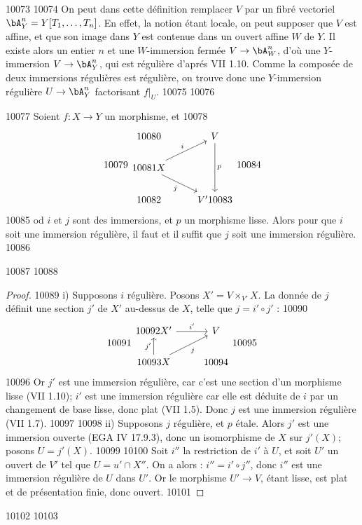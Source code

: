  10073	
 10074	On peut dans cette définition remplacer $V$ par un fibré vectoriel $\bA^n_Y = Y[T_1,\ldots,T_n]$. En effet, la notion étant locale, on peut supposer que $V$ est affine, et que son image dans $Y$ est contenue dans un ouvert affine $W$ de $Y$. Il existe alors un entier $n$ et une $W$-immersion fermée $V \to \bA^n_W$, d'où une $Y$-immersion $V \to \bA^n_Y$, qui est régulière d'aprés VII 1.10. Comme la composée de deux immersions régulières est régulière, on trouve donc une $Y$-immersion régulière $U \to \bA^n_Y$ factorisant $f|_U$.
 10075	
 10076	\begin{proposition}[1.2]%
 10077	Soient $f : X \to Y$ un morphisme, et
 10078	\[
 10079	\begin{tikzcd}
 10080	& V \arrow[dd, "p"] \\
 10081	X \arrow[ru, "i"] \arrow[rd, "j"'] & \\
 10082	& V'
 10083	\end{tikzcd}
 10084	\]
 10085	od $i$ et $j$ sont des immersions, et $p$ un morphisme lisse. Alors pour que $i$ soit une immersion régulière, il faut et il suffit que $j$ soit une immersion régulière.
 10086	\end{proposition}
 10087	
 10088	\begin{proof}
 10089	i) Supposons $i$ régulière. Posons $X' = V \times_{V'} X$. La donnée de $j$ définit une section $j'$ de $X'$ au-dessus de $X$, telle que $j = i' \circ j'$ :
 10090	\[
 10091	\begin{tikzcd}
 10092	X' \arrow[r, "i'"] & V \\
 10093	X \arrow[u, "j'"] \arrow[ru, "j"'] &
 10094	\end{tikzcd}
 10095	\]
 10096	Or $j'$ est une immersion régulière, car c'est une section d'un morphisme lisse (VII 1.10); $i'$ est une immersion régulière car elle est déduite de $i$ par un changement de base lisse, donc plat (VII 1.5). Donc $j$ est une immersion régulière (VII 1.7).
 10097	
 10098	ii) Supposons $j$ régulière, et $p$ étale. Alors $j'$ est une immersion ouverte (EGA IV 17.9.3), donc un isomorphisme de $X$ sur $j'(X)$; posons $U = j'(X)$.
 10099	
 10100	Soit $i''$ la restriction de $i'$ à $U$, et soit $U'$ un ouvert de $V'$ tel que $U = u' \cap X''$. On a alors : $i'' = i' \circ j''$, donc $i''$ est une immersion régulière de $U$ dans $U'$. Or le morphisme $U' \to V$, étant lisse, est plat et de présentation finie, donc ouvert.
 10101	\end{proof}
 10102	
 10103	
